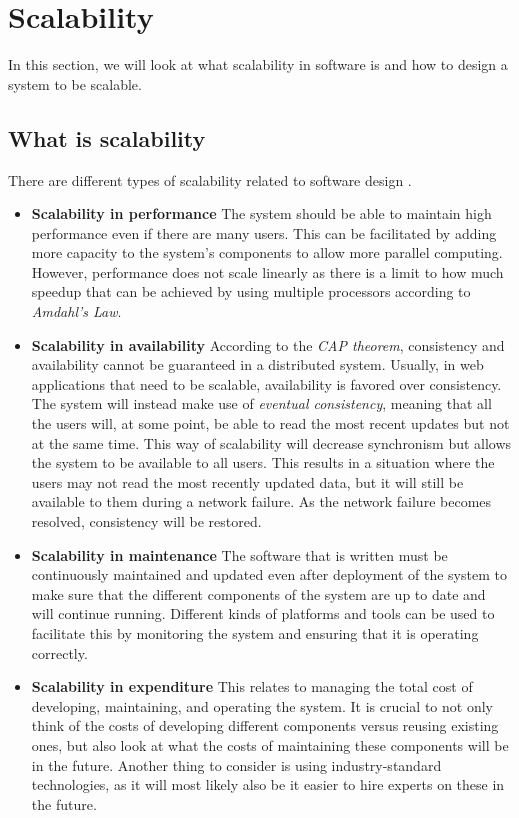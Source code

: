 \section{Scalability}
In this section, we will look at what scalability in software is and how to design a system to be scalable. 

\subsection{What is scalability}
There are different types of scalability related to software design \cite{ScalabilityDesignPrinciples}.
\begin{itemize}
    \item \textbf{Scalability in performance} The system should be able to maintain high performance even if there are many users. This can be facilitated by adding more capacity to the system's components to allow more parallel computing. 
    However, performance does not scale linearly as there is a limit to how much speedup that can be achieved by using multiple processors according to \textit{Amdahl's Law}. 
    \item \textbf{Scalability in availability} According to the \textit{CAP theorem}, consistency and availability cannot be guaranteed in a distributed system. 
    Usually, in web applications that need to be scalable, availability is favored over consistency. 
    The system will instead make use of \textit{eventual consistency}, meaning that all the users will, at some point, be able to read the most recent updates but not at the same time. 
    This way of scalability will decrease synchronism but allows the system to be available to all users.
    This results in a situation where the users may not read the most recently updated data, but it will still be available to them during a network failure.
    As the network failure becomes resolved, consistency will be restored.
    \item \textbf{Scalability in maintenance} The software that is written must be continuously maintained and updated even after deployment of the system to make sure that the different components of the system are up to date and will continue running. 
    Different kinds of platforms and tools can be used to facilitate this by monitoring the system and ensuring that it is operating correctly. 
    \item \textbf{Scalability in expenditure} This relates to managing the total cost of developing, maintaining, and operating the system. 
    It is crucial to not only think of the costs of developing different components versus reusing existing ones, but also look at what the costs of maintaining these components will be in the future. 
    Another thing to consider is using industry-standard technologies, as it will most likely also be it easier to hire experts on these in the future.
\end{itemize}

